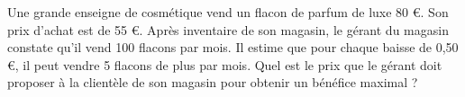 
Une grande enseigne de cosmétique vend un flacon de parfum de luxe 80 €. Son prix d'achat est de 55 €. Après inventaire de son magasin, le gérant du magasin constate qu'il vend 100 flacons par mois. Il estime que pour chaque baisse de 0,50 €, il peut vendre 5 flacons de plus par mois.
Quel est le prix que le gérant doit proposer à la clientèle de son magasin pour obtenir un bénéfice maximal ?
